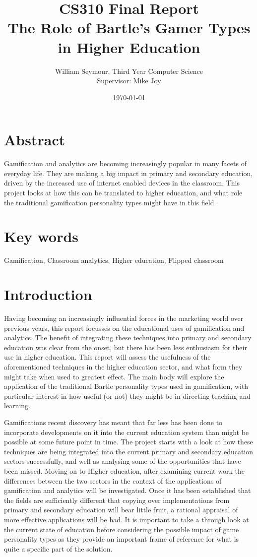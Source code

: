 \documentclass[12pt]{article}
\title{CS310 Final Report \\ The Role of Bartle's Gamer Types in Higher Education}
\author{William Seymour, Third Year Computer Science \\ Supervisor: Mike Joy}
\date{\today}
\begin{document}
\maketitle
\clearpage
\tableofcontents
\listoffigures
\listoftables

\section{Abstract}
Gamification and analytics are becoming increasingly popular in many facets of everyday life. They are making a big impact in primary and secondary education, driven by the increased use of internet enabled devices in the classroom. This project looks at how this can be translated to higher education, and what role the traditional gamification personality types might have in this field.

\section{Key words}
Gamification, Classroom analytics, Higher education, Flipped classroom

\section{Introduction}
Having becoming an increasingly influential forces in the marketing world over previous years, this report focusses on the educational uses of gamification and analytics. The benefit of integrating these techniques into primary and secondary education was clear from the onset, but there has been less enthusiasm for their use in higher education. This report will assess the usefulness of the aforementioned techniques in the higher education sector, and what form they might take when used to greatest effect. The main body will explore the application of the traditional Bartle personality types used in gamification, with particular interest in how useful (or not) they might be in directing teaching and learning.

Gamifications recent discovery has meant that far less has been done to incorporate developments on it into the current education system than might be possible at some future point in time. The project starts with a look at how these techniques are being integrated into the current primary and secondary education sectors successfully, and well as analysing some of the opportunities that have been missed. Moving on to Higher education, after examining current work the differences between the two sectors in the context of the applications of gamification and analytics will be investigated. Once it has been established that the fields are sufficiently different that copying over implementations from primary and secondary education will bear little fruit, a rational appraisal of more effective applications will be had. It is important to take a through look at the current state of education before considering the possible impact of game personality types as they provide an important frame of reference for what is quite a specific part of the solution.
\end{document}
